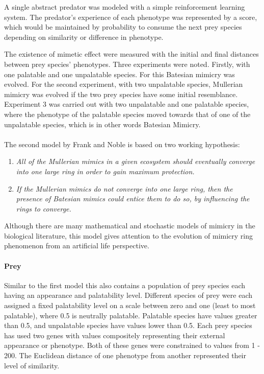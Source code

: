 A single abstract predator was modeled with a simple reinforcement learning system. The predator's experience of each phenotype was represented by a score, which would be maintained by probability to consume the next prey species depending on similarity or difference in phenotype. 

The existence of mimetic effect were measured with the initial and final distances between prey species' phenotypes. Three experiments were noted. Firstly, with one palatable and one unpalatable species. For this Batesian mimicry was evolved. For the second experiment, with two unpalatable species, Mullerian mimicry was evolved if the two prey species have some initial resemblance. Experiment 3 was carried out with two unpalatable and one palatable species, where the phenotype of the palatable species moved towards that of one of the unpalatable species, which is in other words Batesian Mimicry.

\paragraph{}
The second model by Frank and Noble \cite{franks2003} is based on two working hypothesis:

\begin{enumerate}
	\item \textsl{All of the Mullerian mimics in a given ecosystem should eventually converge into one large ring in order to gain maximum protection.}
	\item \textsl{If the Mullerian mimics do not converge into one large ring, then the presence of Batesian mimics could entice them to do so, by influencing the rings to converge.}
\end{enumerate}

Although there are many mathematical and stochastic models of mimicry in the biological literature, this model gives attention to the evolution of mimicry ring phenomenon from an artificial life perspective.

\paragraph{Prey}
Similar to the first model this also contains a population of prey species each having an appearance and palatability level. Different species of prey were each assigned a fixed palatability level on a scale between zero and one (least to most palatable), where 0.5 is neutrally palatable. Palatable species have values greater than 0.5, and unpalatable species have values lower than 0.5. Each prey species has used two genes with values compositely representing their external appearance or phenotype. Both of these genes were constrained to values from 1 - 200. The Euclidean distance of one phenotype from another represented their level of similarity.

